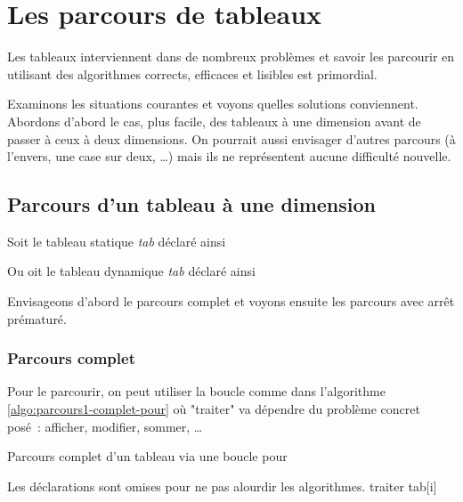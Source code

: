 \chapter{Les parcours de tableaux} \label{Les parcours de tableaux}

Les tableaux interviennent dans de nombreux problèmes 
et savoir les parcourir en utilisant des algorithmes
corrects, efficaces et lisibles est primordial.

Examinons les situations courantes et voyons quelles solutions conviennent.
Abordons d'abord le cas, plus facile, des tableaux à une dimension
avant de passer à ceux à deux dimensions.
On pourrait aussi envisager d'autres parcours
(à l'envers, une case sur deux, \dots) 
mais ils ne représentent aucune difficulté nouvelle.

\section{Parcours d'un tableau à une dimension}

Soit le tableau statique \textit{tab} déclaré ainsi


Ou oit le tableau dynamique \textit{tab} déclaré ainsi



Envisageons d'abord le parcours complet
et voyons ensuite les parcours avec arrêt prématuré.

\subsection{Parcours complet}

Pour le parcourir, on peut utiliser la boucle 
comme dans l'algorithme \vref{algo:parcours1-complet-pour}
où "traiter" va dépendre du problème concret posé~:
afficher, modifier, sommer, \dots

\begin{algorithm}[H]
\begin{pseudo}
	\caption{Parcours complet d'un tableau via une boucle pour}
	\label{algo:parcours1-complet-pour}
	\LComment Les déclarations sont omises pour ne pas alourdir les algorithmes.
		\Stmt traiter tab[i]
	\EndFor
\end{pseudo}
\end{algorithm}

